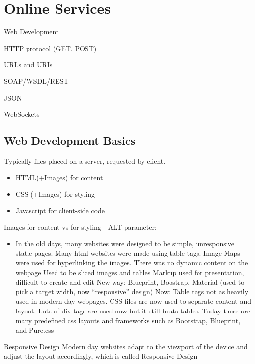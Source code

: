 \documentclass[fancy,11pt,titlestyle=display]{style/elegantbook}
\begin{document}
\chapter{Online Services}

\begin{introduction}[Topics]
\item Web Development
\item HTTP protocol (GET, POST)
\item URLs and URIs
\item SOAP/WSDL/REST
\item JSON
\item WebSockets
\end{introduction}

\section{Web Development Basics}

Typically files placed on a server, requested by client.

\begin{itemize}
    \item HTML(+Images) for content
    \item CSS (+Images) for styling
    \item Javascript for client-side code
\end{itemize}


Images for content vs for styling - ALT parameter:
\begin{itemize}
    \item In the old days, many websites were designed to be simple, unresponsive static pages.
Many html websites were made using table tags.
Image Maps were used for hyperlinking the images.
There was no dynamic content on the webpage
Used to be sliced images and tables
Markup used for presentation, difficult to create and edit
New way: Blueprint, Boostrap, Material (used to pick a target width, now ``responsive'' design)
Now: Table tags not as heavily used in modern day webpages.
CSS files are now used to separate content and layout.
Lots of div tags are used now but it still beats tables.
Today there are many predefined css layouts and frameworks such as Bootstrap, Blueprint, and Pure.css
\end{itemize}


\begin{definition}{Responsive Design}{}
Modern day websites adapt to the viewport of the device and adjust the layout accordingly, which is called Responsive Design.
\end{definition}
\end{document}
